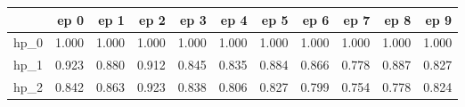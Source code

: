 \begin{tabular}{lrrrrrrrrrr}
\toprule
{} &   ep 0 &   ep 1 &   ep 2 &   ep 3 &   ep 4 &   ep 5 &   ep 6 &   ep 7 &   ep 8 &   ep 9 \\
\midrule
hp\_0 &  1.000 &  1.000 &  1.000 &  1.000 &  1.000 &  1.000 &  1.000 &  1.000 &  1.000 &  1.000 \\
hp\_1 &  0.923 &  0.880 &  0.912 &  0.845 &  0.835 &  0.884 &  0.866 &  0.778 &  0.887 &  0.827 \\
hp\_2 &  0.842 &  0.863 &  0.923 &  0.838 &  0.806 &  0.827 &  0.799 &  0.754 &  0.778 &  0.824 \\
\bottomrule
\end{tabular}
